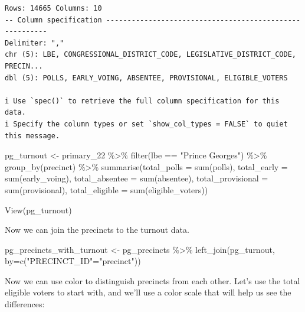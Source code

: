 \documentclass[
  letterpaper,
  DIV=11,
  numbers=noendperiod]{scrreprt}
\newenvironment{Shaded}{\begin{snugshade}}{\end{snugshade}}
\newcommand{\AttributeTok}[1]{\textcolor[rgb]{0.40,0.45,0.13}{#1}}
\newcommand{\FunctionTok}[1]{\textcolor[rgb]{0.28,0.35,0.67}{#1}}
\newcommand{\NormalTok}[1]{\textcolor[rgb]{0.00,0.23,0.31}{#1}}
\newcommand{\OtherTok}[1]{\textcolor[rgb]{0.00,0.23,0.31}{#1}}
\newcommand{\SpecialCharTok}[1]{\textcolor[rgb]{0.37,0.37,0.37}{#1}}
\newcommand{\StringTok}[1]{\textcolor[rgb]{0.13,0.47,0.30}{#1}}
\begin{document}
\begin{verbatim}
Rows: 14665 Columns: 10
-- Column specification --------------------------------------------------------
Delimiter: ","
chr (5): LBE, CONGRESSIONAL_DISTRICT_CODE, LEGISLATIVE_DISTRICT_CODE, PRECIN...
dbl (5): POLLS, EARLY_VOING, ABSENTEE, PROVISIONAL, ELIGIBLE_VOTERS

i Use `spec()` to retrieve the full column specification for this data.
i Specify the column types or set `show_col_types = FALSE` to quiet this message.
\end{verbatim}

\begin{Shaded}
\begin{Highlighting}[]
\NormalTok{pg\_turnout }\OtherTok{\textless{}{-}}\NormalTok{ primary\_22 }\SpecialCharTok{\%\textgreater{}\%} 
  \FunctionTok{filter}\NormalTok{(lbe }\SpecialCharTok{==} \StringTok{"Prince George\textquotesingle{}s"}\NormalTok{) }\SpecialCharTok{\%\textgreater{}\%} 
  \FunctionTok{group\_by}\NormalTok{(precinct) }\SpecialCharTok{\%\textgreater{}\%} 
  \FunctionTok{summarise}\NormalTok{(}\AttributeTok{total\_polls =} \FunctionTok{sum}\NormalTok{(polls), }\AttributeTok{total\_early =} \FunctionTok{sum}\NormalTok{(early\_voing), }\AttributeTok{total\_absentee =} \FunctionTok{sum}\NormalTok{(absentee), }\AttributeTok{total\_provisional =} \FunctionTok{sum}\NormalTok{(provisional), }\AttributeTok{total\_eligible =} \FunctionTok{sum}\NormalTok{(eligible\_voters))}

\FunctionTok{View}\NormalTok{(pg\_turnout)}
\end{Highlighting}
\end{Shaded}

Now we can join the precincts to the turnout data.

\begin{Shaded}
\begin{Highlighting}[]
\NormalTok{pg\_precincts\_with\_turnout }\OtherTok{\textless{}{-}}\NormalTok{ pg\_precincts }\SpecialCharTok{\%\textgreater{}\%} \FunctionTok{left\_join}\NormalTok{(pg\_turnout, }\AttributeTok{by=}\FunctionTok{c}\NormalTok{(}\StringTok{"PRECINCT\_ID"}\OtherTok{=}\StringTok{"precinct"}\NormalTok{))}
\end{Highlighting}
\end{Shaded}

Now we can use color to distinguish precincts from each other. Let's use
the total eligible voters to start with, and we'll use a color scale
that will help us see the differences:
\end{document}
